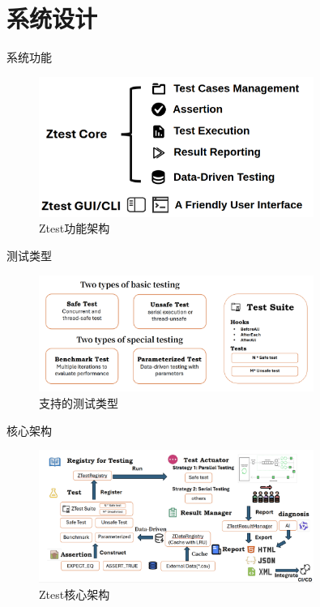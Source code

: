 \documentclass{beamer}
\begin{document}
\section{系统设计}
\begin{frame}{系统功能}
    \begin{figure}
        \centering
        \includegraphics[width=0.8\textwidth]{img/func.png}
        \caption{Ztest功能架构}
    \end{figure}
\end{frame}

\begin{frame}{测试类型}
    \begin{figure}
        \centering
        \includegraphics[width=0.8\textwidth]{img/types.png}
        \caption{支持的测试类型}
    \end{figure}
\end{frame}

\begin{frame}{核心架构}
    \begin{figure}
        \centering
        \includegraphics[width=0.8\textwidth]{img/core.png}
        \caption{Ztest核心架构}
    \end{figure}
\end{frame}
\end{document}
